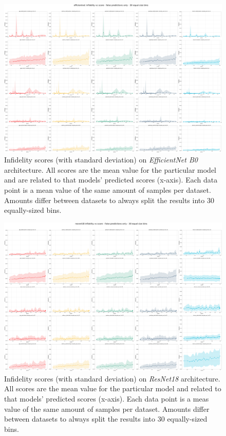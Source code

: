 \begin{figure}[ht]
  \centering
    \includegraphics[width=\textwidth]{appendixes/images/efficientnet-infidelity vs score - false predictions only - 30 equal size bins.png}
    \caption{Infidelity scores (with standard deviation) on \textit{EfficientNet B0} architecture. All scores are the mean value for the particular model and are related to that models' predicted scores (x-axis). Each data point is a mean value of the same amount of samples per dataset. Amounts differ between datasets to always split the results into 30 equally-sized bins.}\label{fig:efficientnet-inf-std}
\end{figure}


\begin{figure}[ht]
  \centering
    \includegraphics[width=\textwidth]{appendixes/images/resnet18-infidelity vs score - false predictions only - 30 equal size bins.png}
    \caption{Infidelity scores (with standard deviation) on \textit{ResNet18} architecture. All scores are the mean value for the particular model and related to that models' predicted scores (x-axis). Each data point is a meas value of the same amount of samples per dataset. Amounts differ between datasets to always split the results into 30 equally-sized bins.}\label{fig:resnet-inf-std}
\end{figure}

